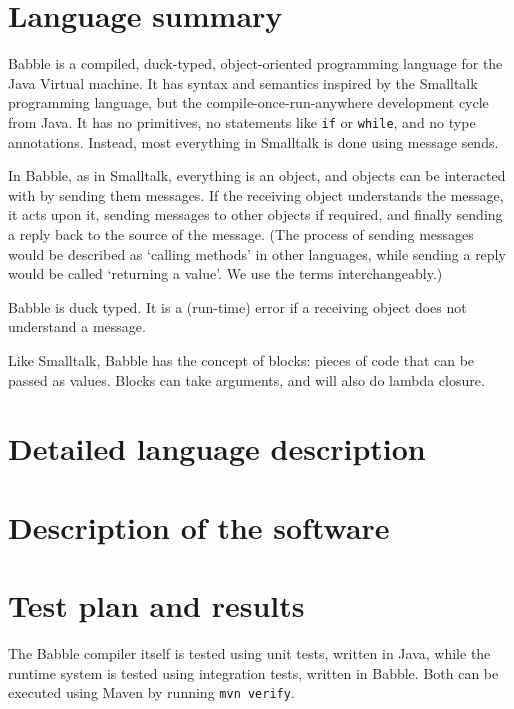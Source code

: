 \documentclass[a4paper]{article}
\begin{document}
\begin{titlepage}
\maketitle
\end{titlepage}

\section{Language summary}
Babble is a compiled, duck-typed, object-oriented programming language for the Java Virtual machine. It has syntax and semantics inspired by the Smalltalk programming language, but the compile-once-run-anywhere development cycle from Java. It has no primitives, no statements like \texttt{if} or \texttt{while}, and no type annotations. Instead, most everything in Smalltalk is done using message sends.

In Babble, as in Smalltalk, everything is an object, and objects can be interacted with by sending them messages. If the receiving object understands the message, it acts upon it, sending messages to other objects if required, and finally sending a reply back to the source of the message. (The process of sending messages would be described as `calling methods' in other languages, while sending a reply would be called `returning a value'. We use the terms interchangeably.)

Babble is duck typed. It is a (run-time) error if a receiving object does not understand a message.

Like Smalltalk, Babble has the concept of blocks: pieces of code that can be passed as values. Blocks can take arguments, and will also do lambda closure. 

\section{Detailed language description}

\section{Description of the software}

\section{Test plan and results}

The Babble compiler itself is tested using unit tests, written in Java, while the runtime system is tested using integration tests, written in Babble. Both can be executed using Maven by running \texttt{mvn verify}.
\end{document}
